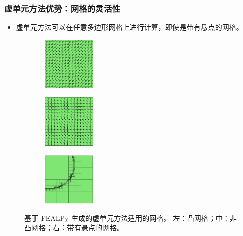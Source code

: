 \documentclass[notheorems,serif]{beamer}
\begin{document}
\begin{frame}
  \frametitle{虚单元方法优势：网格的灵活性}
\begin{itemize}
    \item 虚单元方法可以在任意多边形网格上进行计算，即使是带有悬点的网格。
\end{itemize}
\begin{figure}[htbp]
\centering
\begin{subfigure}[t]{0.32\linewidth}
    \centering
    \includegraphics[width=1.0in]{../figures/convex0.pdf}
\end{subfigure}%
\begin{subfigure}[t]{0.32\linewidth}
    \centering
    \includegraphics[width=1.0in]{../figures/nonconvex0.pdf}
\end{subfigure}%
\begin{subfigure}[t]{0.32\linewidth}
    \centering
    \includegraphics[width=1.0in]{../figures/four.jpg}
\end{subfigure}%
\caption{基于 FEALPy 生成的虚单元方法适用的网格。
左：凸网格；中：非凸网格；右：带有悬点的网格。}
\label{fig:all}
\end{figure}
\end{frame}
\end{document}
